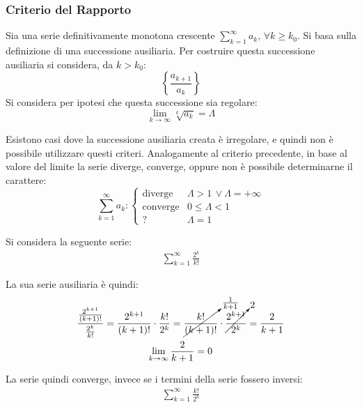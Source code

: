 \documentclass{article}
\numberwithin{equation}{subsection}
\begin{document}
\subsubsection{Criterio del Rapporto}

Sia una serie definitivamente monotona crescente $\sum_{k=1}^\infty a_k,\,\forall k\geq k_0$. 
Si basa sulla definizione di una successione ausiliaria. Per costruire questa successione ausiliaria si considera, da $k>k_0$:
\begin{equation*}
    \displaystyle\left\{\frac{a_{k+1}}{a_k}\right\}
\end{equation*}
Si considera per ipotesi che questa successione sia regolare:
\begin{equation*}
    \lim_{k\to\infty}\sqrt[k]{a_k}=\Lambda
\end{equation*}

Esistono casi dove la successione ausiliaria creata è irregolare, e quindi non è possibile utilizzare questi criteri. %
Analogamente al criterio precedente, in base al valore del limite la serie diverge, converge, oppure non è possibile determinarne il carattere:
\begin{equation}
    \displaystyle\sum_{k=1}^\infty a_k:\begin{cases}
        \text{diverge}&\Lambda > 1\,\lor\Lambda=+\infty\\
        \text{converge}&0\leq\Lambda<1\\
        ?&\Lambda=1
    \end{cases}
\end{equation}


Si considera la seguente serie:
\begin{gather*}
    \displaystyle\sum_{k=1}^\infty\frac{2^k}{k!}
\end{gather*}

La sua serie ausiliaria è quindi:
\begin{gather*}
    \displaystyle\frac{\frac{2^{k+1}}{(k+1)!}}{\frac{2^k}{k!}}=
    \frac{2^{k+1}}{(k+1)!}\cdot\frac{k!}{2^k}=\cancelto{\frac{1}{k+1}}{\frac{k!}{(k+1)!}}\cdot\cancelto{2}{\frac{2^{k+1}}{2^k}}=\frac{2}{k+1}\\
    \lim_{k\to\infty}\frac{2}{k+1}=0
\end{gather*}

La serie quindi converge, invece se i termini della serie fossero inversi:
\begin{gather*}
    \displaystyle\sum_{k=1}^\infty\frac{k!}{2^k}
\end{gather*}
\end{document}
